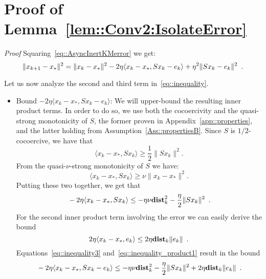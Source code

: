 \documentclass[envcountsect]{svjour3}
\newcommand{\dist}{{\mathbf{dist} }}
\begin{document}
\section{Proof of Lemma~\ref{lem::Conv2:IsolateError} }{\label{app::Conv2:IsolateError}}
{\it Proof} Squaring~\eqref{eq::AsyncInertKMerror} we get:
\begin{equation}{\label{eq::inequality}}
 \|x_{k+1}-x_\ast\|^2 = \|x_{k}-x_\ast\|^2 -2\eta\langle x_k-x_\ast, Sx_k-e_k \rangle +\eta^2\|Sx_k-e_k\|^2\enspace.
\end{equation}

Let us now analyze the second and third term in~\eqref{eq::inequality}.
\begin{itemize}
 \item Bound $-2\eta\langle x_k-x_\ast, Sx_k-e_k \rangle$: We will upper-bound the resulting inner product terms.
 In order to do so, we use both the cocoercivity and the quasi-strong monotonicity of $S$,
 the former proven in Appendix~\ref{app::properties}, and the latter holding from Assumption~\ref{Ass::propertiesB}.
Since $S$ is $1/2$-cocoercive, we have that
\[
 \langle x_k-x_\ast,Sx_k\rangle \geq \frac{1}{2}\|Sx_k\|^2.
\]
From the quasi-$\nu$-strong monotonicity of $S$ we have:
\[
 \langle x_k-x_\ast,Sx_k\rangle \geq \nu\|x_k-x_\ast\|^2.
\]
Putting these two together, we get that
\begin{equation}{\label{eq::inequality3}}
 -2\eta\langle x_k-x_\ast,Sx_k\rangle \leq -\eta\nu\dist_k^2
                   -\frac{\eta}{2}\|Sx_k\|^2\enspace.
\end{equation}
For the second inner product term involving the error we can easily derive the bound
\begin{equation}{\label{eq::inequality_product1}}
 2\eta\langle x_k-x_\ast,e_k\rangle \leq 2\eta\dist_k\|e_k\|\enspace.
\end{equation}
Equations~\eqref{eq::inequality3} and~\eqref{eq::inequality_product1} result in the bound
\begin{equation}{\label{eq::inner_product1}}
-2\eta\langle x_k-x_\ast, Sx_k-e_k\rangle \leq -\eta\nu\dist_k^2-\frac{\eta}{2}\|Sx_k\|^2 + 2\eta\dist_k\|e_k\|\enspace.
\end{equation}


\end{itemize}
\end{document}
